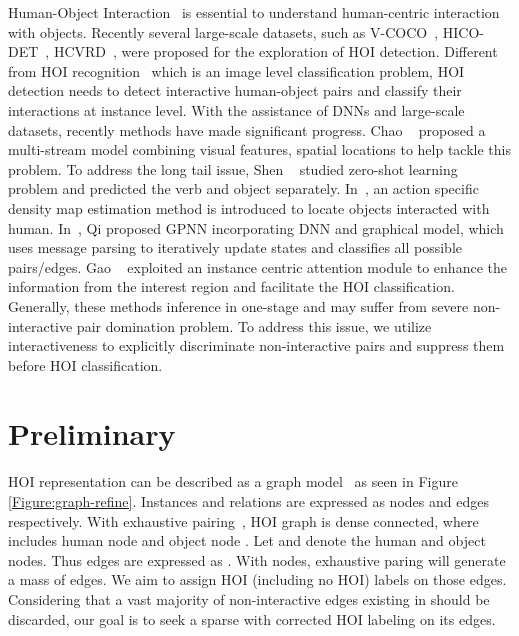 \documentclass[10pt,twocolumn,letterpaper]{article}
\begin{document}
 Human-Object Interaction~\cite{Wang2006Unsupervised,Yang2010Recognizing,Ikizler2008Recognizing} is essential to understand human-centric interaction with objects. Recently several large-scale datasets, such as V-COCO~\cite{vcoco}, HICO-DET~\cite{hicodet}, HCVRD~\cite{hcvrd}, were proposed for the exploration of HOI detection.
Different from HOI recognition~\cite{Fang2018Pairwise,Delaitre2010Recognizing,hico,Chao2014Predicting,Mallya2016Learning} which is an image level classification problem, HOI detection needs to detect interactive human-object pairs and classify their interactions at instance level. 
With the assistance of DNNs and large-scale datasets, recently methods have made significant progress.
Chao \etal~\cite{hicodet} proposed a multi-stream model combining visual features, spatial locations to help tackle this problem.
To address the long tail issue, Shen \etal~\cite{Shen2018Scaling} studied zero-shot learning problem and predicted the verb and object separately.
In~\cite{Gkioxari2017Detecting}, an action specific density map estimation method is introduced to locate objects interacted with human. 
In~\cite{qi2018learning}, Qi \etal proposed GPNN incorporating DNN and graphical model, which uses message parsing to iteratively update states and classifies all possible pairs/edges.
Gao \etal~\cite{gao2018ican} exploited an instance centric attention module to enhance the information from the interest region and facilitate the HOI classification.
Generally, these methods inference in one-stage and may suffer from severe non-interactive pair domination problem. To address this issue, we utilize interactiveness to explicitly discriminate non-interactive pairs and suppress them before HOI classification.
\vspace{-0.3cm}

\section{Preliminary}
HOI representation can be described as a graph model~\cite{qi2018learning, xu2017scene} as seen in Figure \ref{Figure:graph-refine}. Instances and relations are expressed as nodes and edges respectively. With exhaustive pairing~\cite{Gkioxari2017Detecting,gao2018ican}, HOI graph  is dense connected, where  includes human node  and object node . 
Let  and  denote the human and object nodes. Thus edges  are expressed as . With  nodes, exhaustive paring will generate a mass of edges. We aim to assign HOI (including no HOI) labels on those edges. Considering that a vast majority of non-interactive edges existing in  should be discarded, our goal is to seek a sparse  with corrected HOI labeling on its edges.
\end{document}
